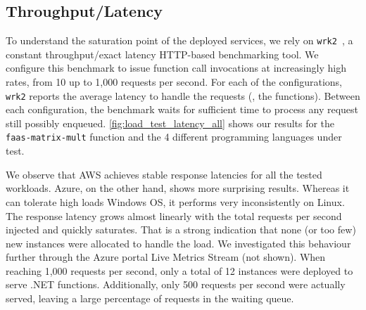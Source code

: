 \subsection{Throughput/Latency}
\label{sec:loadtest}

To understand the saturation point of the deployed services, we rely on \texttt{wrk2}~\cite{wrk2}, a constant throughput/exact latency HTTP-based benchmarking tool.
We configure this benchmark to issue function call invocations at increasingly high rates, from 10 up to 1,000 requests per second.
For each of the configurations, \texttt{wrk2} reports the average latency to handle the requests (\ie, the functions).
Between each configuration, the benchmark waits for sufficient time to process any request still possibly enqueued.
\autoref{fig:load_test_latency_all} shows our results for the \texttt{faas-matrix-mult} function and the 4 different programming languages under test.

We observe that \gls{AWS} achieves stable response latencies for all the tested workloads. 
Azure, on the other hand, shows more surprising results.
Whereas it can tolerate high loads Windows OS, it performs very inconsistently on Linux.
The response latency grows almost linearly with the total requests per second injected and quickly saturates. 
That is a strong indication that none (or too few) new instances were allocated to handle the load. 
We investigated this behaviour further through the Azure portal Live Metrics Stream (not shown). 
When reaching 1,000 requests per second, only a total of 12 instances were deployed to serve .NET functions. %
Additionally, only 500 requests per second were actually served, leaving a large percentage of requests in the waiting queue.


